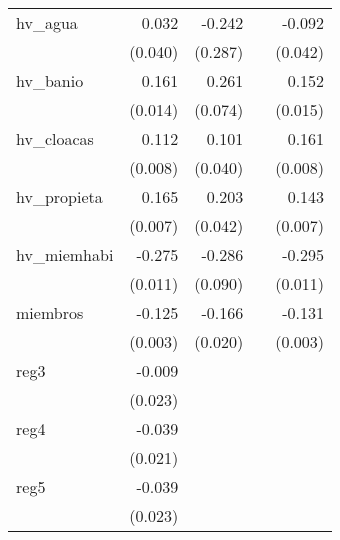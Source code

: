 {\begin{longtable}{l*{4}{D{.}{.}{-1}}}
\addlinespace
hv\_agua     &       0.032         &      -0.242         &                     &      -0.092\sym{*}  \\
            &     (0.040)         &     (0.287)         &                     &     (0.042)         \\
\addlinespace
hv\_banio    &       0.161\sym{***}&       0.261\sym{***}&                     &       0.152\sym{***}\\
            &     (0.014)         &     (0.074)         &                     &     (0.015)         \\
\addlinespace
hv\_cloacas  &       0.112\sym{***}&       0.101\sym{*}  &                     &       0.161\sym{***}\\
            &     (0.008)         &     (0.040)         &                     &     (0.008)         \\
\addlinespace
hv\_propieta &       0.165\sym{***}&       0.203\sym{***}&                     &       0.143\sym{***}\\
            &     (0.007)         &     (0.042)         &                     &     (0.007)         \\
\addlinespace
hv\_miemhabi &      -0.275\sym{***}&      -0.286\sym{**} &                     &      -0.295\sym{***}\\
            &     (0.011)         &     (0.090)         &                     &     (0.011)         \\
\addlinespace
miembros    &      -0.125\sym{***}&      -0.166\sym{***}&                     &      -0.131\sym{***}\\
            &     (0.003)         &     (0.020)         &                     &     (0.003)         \\
\addlinespace
reg3        &      -0.009         &                     &                     &                     \\
            &     (0.023)         &                     &                     &                     \\
\addlinespace
reg4        &      -0.039         &                     &                     &                     \\
            &     (0.021)         &                     &                     &                     \\
\addlinespace
reg5        &      -0.039         &                     &                     &                     \\
            &     (0.023)         &                     &                     &                     \\

\end{longtable}}
